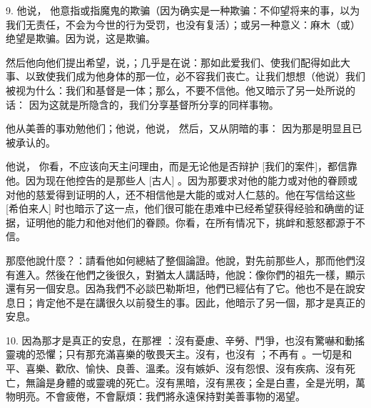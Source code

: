 9.  他说， 他意指或指魔鬼的欺骗（因为确实是一种欺骗：不仰望将来的事，以为我们无责任，不会为今世的行为受罚，也没有复活）；或另一种意义：麻木（或）绝望是欺骗。因为说，这是欺骗。\par

然后他向他们提出希望，说，；几乎是在说：那如此爱我们、使我们配得如此大事、以致使我们成为他身体的那一位，必不容我们丧亡。让我们想想（他说）我们被视为什么：我们和基督是一体；那么，不要不信他。他又暗示了另一处所说的话：  因为这就是所隐含的，我们分享基督所分享的同样事物。\par

他从美善的事劝勉他们；他说，他说， 然后，又从阴暗的事：  因为那是明显且已被承认的。\par

  他说， 你看，不应该向天主问理由，而是无论他是否辩护 [我们的案件]，都信靠他。因为现在他控告的是那些人 [古人] 。因为那要求对他的能力或对他的眷顾或对他的慈爱得到证明的人，还不相信他是大能的或对人仁慈的。他在写信给这些 [希伯来人] 时也暗示了这一点，他们很可能在患难中已经希望获得经验和确凿的证据，证明他的能力和他对他们的眷顾。你看，在所有情况下，挑衅和惹怒都源于不信。\par

那麼他說什麼？：請看他如何總結了整個論證。他說，對先前那些人，那而他們沒有進入。然後在他們之後很久，對猶太人講話時，他說：像你們的祖先一樣，顯示還有另一個安息。因為我們不必談巴勒斯坦，他們已經佔有了它。他也不是在說安息日；肯定他不是在講很久以前發生的事。因此，他暗示了另一個，那才是真正的安息。\par

10. 因為那才是真正的安息，在那裡 ：沒有憂慮、辛勞、鬥爭，也沒有驚嚇和動搖靈魂的恐懼；只有那充滿喜樂的敬畏天主。沒有，也沒有 ；不再有 。一切是和平、喜樂、歡欣、愉快、良善、溫柔。沒有嫉妒、沒有怨恨、沒有疾病、沒有死亡，無論是身體的或靈魂的死亡。沒有黑暗，沒有黑夜；全是白晝，全是光明，萬物明亮。不會疲倦，不會厭煩：我們將永遠保持對美善事物的渴望。\par

